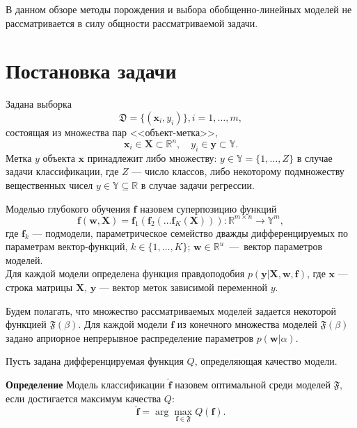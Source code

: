 В данном обзоре методы порождения и выбора обобщенно-линейных моделей не рассматривается в силу общности рассматриваемой задачи. 

\section{Постановка задачи}
Задана выборка  \begin{equation}\label{eq:dataset}\mathfrak{D} = \{(\mathbf{x}_i,y_i)\}, i = 1,\dots,m,\end{equation} состоящая из множества пар <<объект-метка>>, $$\mathbf{x}_i \in \mathbf{X} \subset \mathbb{R}^n, \quad {y}_i \in \mathbf{y} \subset \mathbb{Y}.$$ Метка ${y}$  объекта $\mathbf{x}$ принадлежит либо множеству: ${y} \in \mathbb{Y} = \{1, \dots, Z\}$ в случае задачи классификации, где $Z$ --- число классов, либо некоторому подмножеству вещественных чисел ${y} \in \mathbb{Y}  \subseteq \mathbb{R}$ в случае задачи регрессии.

Моделью глубокого обучения $\mathbf{f}$ назовем суперпозицию функций
\begin{equation}
\label{eq:main}
 \mathbf{f}(\mathbf{w}, \mathbf{X}) = \mathbf{f}_1(\mathbf{f}_2(\dots \mathbf{f}_K( \mathbf{X}))): \mathbb{R}^{m \times n} \to \mathbb{Y}^m,
\end{equation}
где $\mathbf{f}_k$ --- подмодели, параметрическое семейство дважды дифференцируемых по параметрам вектор-функций, $k \in \{1,\dots,K\}$; $\mathbf{w} \in \mathbb{R}^u$~---~вектор параметров моделей.\\

Для каждой модели определена функция правдоподобия  $p(\mathbf{y}|\mathbf{X}, \mathbf{w}, \mathbf{f})$, где $\mathbf{x}$ --- строка матрицы $\mathbf{X}$, $\mathbf{y}$ --- вектор меток зависимой переменной $y$.

Будем полагать, что множество рассматриваемых моделей задается некоторой функцией  $\mathfrak{F}(\beta)$. Для каждой модели $\mathbf{f}$ из конечного множества моделей $\mathfrak{F}(\beta)$ задано априорное непрерывное распределение параметров $p(\mathbf{w}|\alpha)$. 


Пусть задана дифференцируемая функция $Q$, определяющая качество модели.


\textbf{Определение }Модель классификации $\hat{\mathbf{f}}$ назовем оптимальной среди моделей $\mathfrak{F}$, если достигается максимум качества $Q$:
    $$
        \hat{\mathbf{f}}  = \arg\max_{\mathbf{f} \in \mathfrak{F}} Q(\mathbf{f}).
    $$

